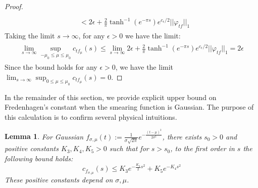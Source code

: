 \documentclass[a4paper,11pt]{article}
\newtheorem{lemma}[theorem]{Lemma}
\theoremstyle{definition}
\begin{document}
\begin{proof}
\begin{align}
\begin{split}
            \\&
            < 2\epsilon + \frac{2}{\pi}\tanh^{-1}(e^{-\pi s})e^{c_\epsilon / 2}||\varphi_{tf}||_1
        \end{split}    
    \end{align}
    Taking the limit $s\rightarrow\infty$, for any $\epsilon > 0$ we have the limit:
    \begin{align}
        \begin{split}
            \lim_{s\rightarrow\infty}\sup_{-\mu_0\leq \mu\leq \mu_0}c_{tf_\mu}(s) \leq \lim_{s\rightarrow\infty}2\epsilon + \frac{2}{\pi}\tanh^{-1}(e^{-\pi s})e^{c_\epsilon / 2}||\varphi_{tf}||_1 = 2\epsilon
        \end{split}
    \end{align}
    Since the bound holds for any $\epsilon > 0$, we have the limit $\lim_{s\rightarrow\infty}\sup_{0\leq \mu\leq \mu_0}c_{tf_\mu}(s) = 0$.
\end{proof}
In the remainder of this section, we provide explicit upper bound on Fredenhagen's constant when the smearing function is Gaussian. The purpose of this calculation is to confirm several physical intuitions.
\begin{lemma}
    For Gaussian $f_{\sigma,\mu}(t) := \frac{1}{\sigma\sqrt{2\pi}}e^{-\frac{(t - \mu)^2}{2\sigma^2}}$, there exists $s_0 > 0$ and positive constants $K_3, K_4, K_5 > 0$ such that for $s > s_0$, to the first order in $s$ the following bound holds:
    \begin{equation}
        c_{f_{\sigma,\mu}}(s) \leq K_3e^{-\frac{K_4}{2}s^2} + K_5e^{-K_4 s^2}
    \end{equation}
    These positive constants depend on $\sigma,\mu$.
\end{lemma}
\end{document}
